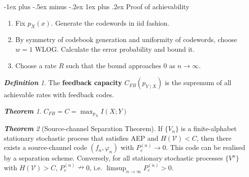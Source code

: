 \documentclass[frenchspacing,9pt,landscape,a4paper]{article}
\makeatletter
\renewcommand{\subsubsection}{\@startsection{subsubsection}{3}{0mm}%
                                {-1ex plus -.5ex minus -.2ex}%
                                {1ex plus .2ex}%
                                {\normalfont\small\bfseries}}
\theoremstyle{remark}
\newtheorem*{thm}{\textbf{Theorem}}
\newtheorem*{defn}{\textbf{Definition}}
\makeatother
\begin{document}
\begin{multicols}{4}
\subsubsection{Proof of achievability}
\begin{enumerate}
    \item Fix $p_X(x)$. Generate the codewords in iid fashion.
    \item By symmetry of codebook generation and uniformity of codewords, choose $w=1$ WLOG. Calculate the
        error probability and bound it.
    \item Choose a rate $R$ such that the bound approaches 0 as  $n\to\infty$.
\end{enumerate}
\begin{defn}
    The \textbf{feedback capacity} $C_{FB}(p_{Y\mid X})$ is the supremum of all achievable rates with
    feedback codes.
\end{defn}
\begin{thm}
    $C_{FB}=C=\max_{p_X} I(X;Y)$
\end{thm}
\begin{thm}[Source-channel Separation Theorem]
    If $\{V_n\}$ is a finite-alphabet stationary stochastic process that satisfies AEP and
    $H(\mathcal{V})<C$, then there exists a source-channel code  $(f_n,\varphi_n)$ with  $P_e^{(n)}\to 0$.
    This code can be realised by a separation scheme. Conversely, for all stationary stochastic processes
    $\{V^n\}$ with  $H(\mathcal{V})>C$,  $P_e^{(n)}\nrightarrow 0$, i.e.
    $\limsup_{n\to\infty}P_e^{(n)}>0$.
\end{thm}
\end{multicols}
\end{document}
